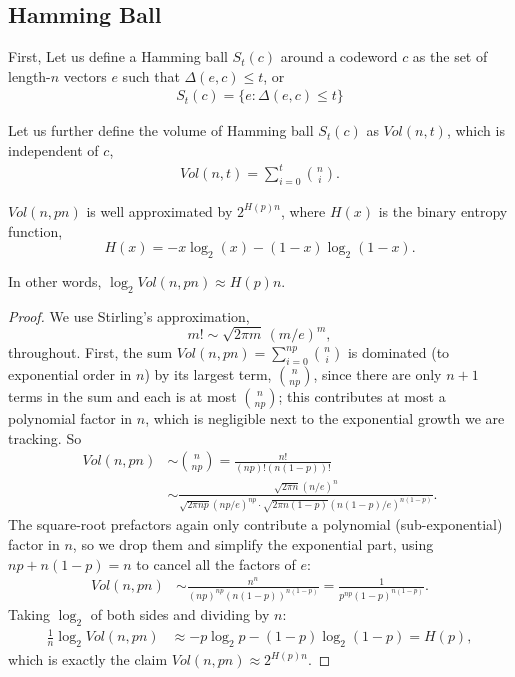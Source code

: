 \subsection{Hamming Ball}
First, Let us define a Hamming ball \(S_t(c)\) around a codeword \(c\) as the set of length-\(n\) vectors \(e\) such that \(\Delta(e,c) \leq t\), or 
\begin{align*}
    S_t(c) = \{e: \Delta(e,c) \leq t\}
\end{align*}

Let us further define the volume of Hamming ball \(S_t(c)\) as \(Vol(n, t)\), which is independent of \(c\),
\begin{align*}
Vol(n, t) = \sum_{i=0}^{t}  \binom{n}{i}.    
\end{align*}

\begin{lemma}
\(Vol(n, pn)\) is well approximated by \(2^{H(p) n}\), where \(H(x)\) is the binary entropy function, 
\[H(x) = - x \log_2(x) - (1-x) \log_2(1-x).\]

In other words, 
\(\log_2 Vol(n, pn) \approx H(p) n.\)
\end{lemma}

\begin{proof}
We use Stirling's approximation, 
\[
m! \sim \sqrt{2\pi m}\, (m/e)^{m},
\]
throughout. First, the sum \(Vol(n,pn) = \sum_{i=0}^{np} \binom{n}{i}\) is dominated (to exponential order in \(n\)) by its largest term, \(\binom{n}{np}\), since there are only \(n+1\) terms in the sum and each is at most \(\binom{n}{np}\); this contributes at most a polynomial factor in \(n\), which is negligible next to the exponential growth we are tracking. So
\begin{align*}
Vol(n, pn) &\sim \binom{n}{np} = \frac{n!}{(np)!(n(1-p))!}\\
        &\sim \frac{\sqrt{2\pi n} (n/e)^n} {\sqrt{2\pi np} (np/e)^{np} \cdot \sqrt{2\pi n(1-p)} (n(1-p)/e)^{n(1-p)}}.
\end{align*}
The square-root prefactors again only contribute a polynomial (sub-exponential) factor in \(n\), so we drop them and simplify the exponential part, using \(np + n(1-p) = n\) to cancel all the factors of \(e\):
\begin{align*}
Vol(n,pn) &\sim \frac{n^n}{(np)^{np}(n(1-p))^{n(1-p)}} = \frac{1}{p^{np}(1-p)^{n(1-p)}}.
\end{align*}
Taking \(\log_2\) of both sides and dividing by \(n\):
\begin{align*}
    \frac{1}{n}\log_2 Vol(n,pn) &\approx -p\log_2 p - (1-p)\log_2(1-p) = H(p),
\end{align*}
which is exactly the claim \(Vol(n,pn) \approx 2^{H(p)n}\).
\end{proof}

